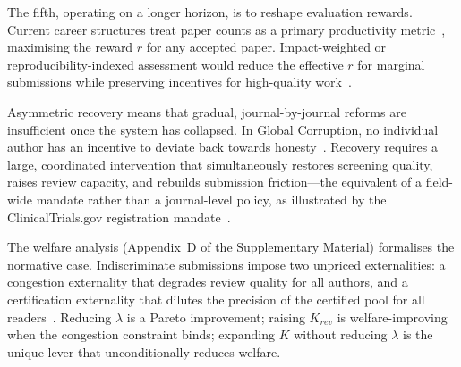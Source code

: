 \documentclass{article}
\begin{document}
The fifth, operating on a longer horizon, is to reshape evaluation rewards.
Current career structures treat paper counts as a primary productivity metric~\citep{Smaldino2016, casadevall2014reforming}, maximising the reward $r$ for any accepted paper.
Impact-weighted or reproducibility-indexed assessment would reduce the effective $r$ for marginal submissions while preserving incentives for high-quality work~\citep{Stephan2012}.

Asymmetric recovery means that gradual, journal-by-journal reforms are insufficient once the system has collapsed.
In Global Corruption, no individual author has an incentive to deviate back towards honesty~\citep{Scheffer2001}.
Recovery requires a large, coordinated intervention that simultaneously restores screening quality, raises review capacity, and rebuilds submission friction---the equivalent of a field-wide mandate rather than a journal-level policy, as illustrated by the ClinicalTrials.gov registration mandate~\citep{DeAngelis2004}.

The welfare analysis (Appendix~D of the Supplementary Material) formalises the normative case.
Indiscriminate submissions impose two unpriced externalities: a congestion externality that degrades review quality for all authors, and a certification externality that dilutes the precision of the certified pool for all readers~\citep{Akerlof1970, Ostrom1990}.
Reducing $\lambda$ is a Pareto improvement; raising $K_{rev}$ is welfare-improving when the congestion constraint binds; expanding $K$ without reducing $\lambda$ is the unique lever that unconditionally reduces welfare.
\end{document}

